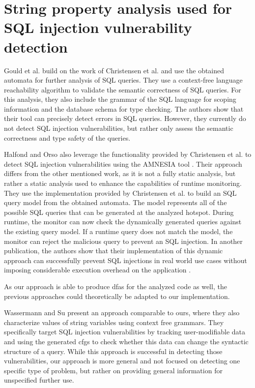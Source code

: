 \section{String property analysis used for SQL injection vulnerability detection}\label{sec:related:stringPropertySql}

Gould et al. \cite{gould2004static} build on the work of Christensen et al. and use the obtained automata for further analysis of SQL queries. They use a context-free language reachability algorithm to validate the semantic correctness of SQL queries. For this analysis, they also include the grammar of the SQL language for scoping information and the database schema for type checking.
The authors show that their tool can precisely detect errors in SQL queries. However, they currently do not detect SQL injection vulnerabilities, but rather only assess the semantic correctness and type safety of the queries.

Halfond and Orso also leverage the functionality provided by Christensen et al. to detect SQL injection vulnerabilities using the AMNESIA tool \cite{amnesia}. Their approach differs from the other mentioned work, as it is not a fully static analysis, but rather a static analysis used to enhance the capabilities of runtime monitoring. They use the implementation provided by Christensen et al. to build an SQL query model from the obtained automata. The model represents all of the possible SQL queries that can be generated at the analyzed hotspot.
During runtime, the monitor can now check the dynamically generated queries against the existing query model. If a runtime query does not match the model, the monitor can reject the malicious query to prevent an SQL injection. In another publication, the authors show that their implementation of this dynamic approach can successfully prevent SQL injections in real world use cases without imposing considerable execution overhead on the application \cite{amnesia_evaluation}.

As our approach is able to produce \acp{dfa} for the analyzed code as well, the previous approaches could theoretically be adapted to our implementation.

Wassermann and Su \cite{sqli_wassermann_su} present an approach comparable to ours, where they also characterize values of string variables using context free grammars. They specifically target SQL injection vulnerabilities by tracking user-modifiable data and using the generated \acp{cfg} to check whether this data can change the syntactic structure of a query. While this approach is successful in detecting those vulnerabilities, our approach is more general and not focused on detecting one specific type of problem, but rather on providing general information for unspecified further use.

